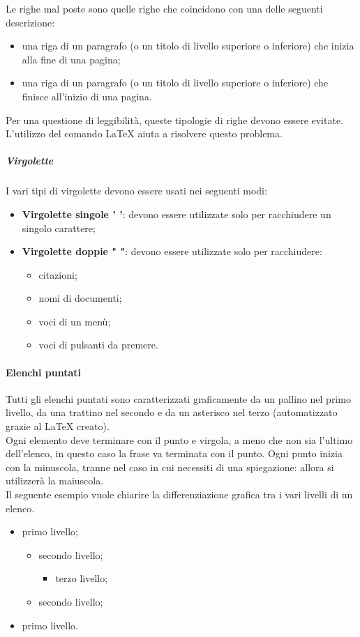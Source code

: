 Le righe mal poste sono quelle righe che coincidono con una delle seguenti descrizione:
\begin{itemize}
	\item una riga di un paragrafo (o un titolo di livello superiore o inferiore) che inizia alla fine di una pagina;
	\item una riga di un paragrafo (o un titolo di livello superiore o inferiore) che finisce all'inizio di una pagina.
\end{itemize}
Per una questione di leggibilità, queste tipologie di righe devono essere evitate.\\
 L'utilizzo del comando \LaTeX{}  aiuta a risolvere questo problema.
 \subparagraph{Virgolette}
 I vari tipi di virgolette devono essere usati nei seguenti modi:
 \begin{itemize}
 	\item \textbf{Virgolette singole ' '}: devono essere utilizzate solo per racchiudere un singolo carattere;
 	\item \textbf{Virgolette doppie " "}: devono essere utilizzate solo per racchiudere:
 	\begin{itemize}
 		\item citazioni;
 		\item nomi di documenti;
 		\item voci di un menù;
 		\item voci di pulsanti da premere.
 	\end{itemize}
 \end{itemize}
 \paragraph{Elenchi puntati}
Tutti gli elenchi puntati sono caratterizzati graficamente da un pallino nel primo livello, da una trattino nel secondo e da un asterisco nel terzo (automatizzato grazie al  \LaTeX{}{} creato). \\
Ogni elemento deve terminare con il punto e virgola, a meno che non sia l'ultimo dell'elenco, in questo caso la frase va terminata con il punto. Ogni punto inizia con la minuscola, tranne nel caso in cui necessiti di una spiegazione: allora
si utilizzerà la maiuscola.\\
Il seguente esempio vuole chiarire la differenziazione grafica tra i vari livelli di un elenco.
\begin{itemize}
	\item primo livello;
	\begin{itemize}
		\item secondo livello;
		\begin{itemize}
			\item terzo livello;
		\end{itemize}
		\item secondo livello;
	\end{itemize}
	\item primo livello.
\end{itemize}
